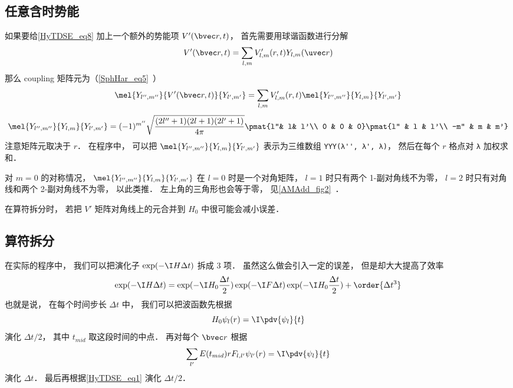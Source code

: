 \subsection{任意含时势能}
如果要给\autoref{HyTDSE_eq8} 加上一个额外的势能项 $V'(\bvec r, t)$， 首先需要用球谐函数进行分解
\begin{equation}\label{HyTDSE_eq6}
V'(\bvec r, t) = \sum_{l,m} V'_{l,m}(r, t) Y_{l,m}(\uvec r)
\end{equation}
那么 coupling 矩阵元为（\autoref{SphHar_eq5}~）
\begin{equation}\label{HyTDSE_eq5}
\mel{Y_{l'',m''}}{V'(\bvec r, t)}{Y_{l',m'}} = \sum_{l,m} V'_{l,m}(r, t) \mel{Y_{l'',m''}}{Y_{l,m}}{Y_{l',m'}}
\end{equation}
\begin{equation}
\mel{Y_{l'',m''}}{Y_{l,m}}{Y_{l',m'}} = (-1)^{m''}\sqrt{\frac{(2l''+1)(2l+1)(2l'+1)}{4\pi}} \pmat{l''& l& l'\\ 0 & 0 & 0}\pmat{l'' & l & l'\\  -m'' & m & m'}
\end{equation}
注意矩阵元取决于 $r$． 在程序中， 可以把 $\mel{Y_{l'',m''}}{Y_{l,m}}{Y_{l',m'}}$ 表示为三维数组 \verb|YYY(λ'', λ', λ)|， 然后在每个 $r$ 格点对 \verb|λ| 加权求和．

对 $m = 0$ 的对称情况， $\mel{Y_{l'',m''}}{Y_{l,m}}{Y_{l',m'}}$ 在 $l = 0$ 时是一个对角矩阵， $l = 1$ 时只有两个 1-副对角线不为零， $l = 2$ 时只有对角线和两个 2-副对角线不为零， 以此类推． 左上角的三角形也会等于零， 见\autoref{AMAdd_fig2}~．

在算符拆分时， 若把 $V'$ 矩阵对角线上的元合并到 $H_0$ 中很可能会减小误差．

\subsection{算符拆分}
在实际的程序中， 我们可以把演化子 $\exp(-\I H \Delta t)$ 拆成 3 项． 虽然这么做会引入一定的误差， 但是却大大提高了效率
\begin{equation}\label{HyTDSE_eq2}
\exp(-\I H \Delta t) = \exp(-\I H_0 \frac{\Delta t}{2}) \exp(-\I F \Delta t)\exp(-\I H_0 \frac{\Delta t}{2}) + \order{\Delta t^3}
\end{equation}
也就是说， 在每个时间步长 $\Delta t$ 中， 我们可以把波函数先根据
\begin{equation}\label{HyTDSE_eq1}
H_0 \psi_{l}(r) = \I \pdv{\psi_{l}}{t}
\end{equation}
演化 $\Delta t/2$， 其中 $t_{mid}$ 取这段时间的中点． 再对每个 $\bvec r$ 根据
\begin{equation}
\sum_{l'} E(t_{mid})rF_{l, l'} \psi_{l'}(r) = \I \pdv{\psi_{l}}{t}
\end{equation}
演化 $\Delta t$． 最后再根据\autoref{HyTDSE_eq1} 演化 $\Delta t/2$．

